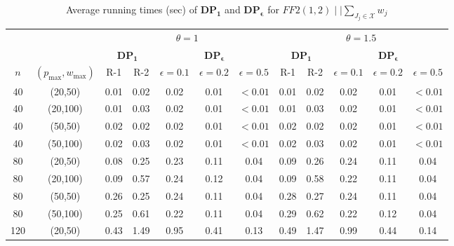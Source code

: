 \documentclass[12pt, eqno, limlimits]{article}
\begin{document}
\begin{sloppypar}
        \begin{table}[htpb]
            \footnotesize  
            \setlength{\tabcolsep}{2 pt} %
            \caption{Average running times (sec) of $\mathbf{DP_1}$ and $\mathbf{DP_{\epsilon}}$ for $FF2(1, 2)\mid  \mid \sum_{J_j \in \mathcal{X}} w_j$}  \label{TA-FF12}
            \vspace{-10pt} 
            \begin{center}
                \begin{tabular}{cccccccccccc}  \hline	
                    \multicolumn{2}{c}{} & \multicolumn{5}{c}{$\theta=1$} & \multicolumn{5}{c}{$\theta=1.5$}\\ 
                    \cmidrule(lr){3-7} \cmidrule(lr){8-12}
                    \multicolumn{2}{c}{} & \multicolumn{2}{c}{$\mathbf{DP_1}$} & \multicolumn{3}{c}{$\mathbf{DP_{\epsilon}}$} & \multicolumn{2}{c}{$\mathbf{DP_1}$} & \multicolumn{3}{c}{$\mathbf{DP_{\epsilon}}$} \\ 
                    \cmidrule(lr){3-4} \cmidrule(lr){5-7} \cmidrule(lr){8-9} \cmidrule(lr){10-12}
                    $n$ & $(p_{\max},w_{\max})$&  R-1 &   R-2 & $\epsilon=0.1$ &$\epsilon=0.2$ & $\epsilon=0.5$ & R-1 &   R-2 &$\epsilon=0.1$ &$\epsilon=0.2$ & $\epsilon=0.5$  \\ \hline
                    40 & (20,50)  & 0.01 & 0.02 & 0.02 & 0.01 & $<0.01$ & 0.01 & 0.02 & 0.02 & 0.01 & $<0.01$  \\ 
                    40 & (20,100) & 0.01 & 0.03 & 0.02 & 0.01 & $<0.01$ & 0.01 & 0.03 & 0.02 & 0.01 & $<0.01$   \\ 
                    40 & (50,50)  & 0.02 & 0.02 & 0.02 & 0.01 & $<0.01$ & 0.02 & 0.02 & 0.02 & 0.01 & $<0.01$  \\ 
                    40 & (50,100) & 0.02 & 0.03 & 0.02 & 0.01 & $<0.01$ & 0.02 & 0.03 & 0.02 & 0.01 & $<0.01$   \\ 
                    80 & (20,50)  & 0.08 & 0.25	& 0.23 & 0.11 &	0.04 & 0.09 & 0.26 & 0.24 & 0.11 & 0.04  \\ 
                    80 & (20,100) & 0.09 & 0.57 & 0.24 & 0.12 &	0.04 & 0.09	& 0.58 & 0.22 &	0.11 & 0.04	  \\ 
                    80 & (50,50)  & 0.26 & 0.25	& 0.24 & 0.11 & 0.04 & 0.28	& 0.27 & 0.24 &	0.11 & 0.04   \\ 
                    80 & (50,100) & 0.25 & 0.61	& 0.22 & 0.11 &	0.04 & 0.29	& 0.62 & 0.22 & 0.12 & 0.04   \\ 
                    120 & (20,50)  & 0.43 &	1.49 & 0.95 & 0.41 & 0.13 &	0.49 & 1.47	& 0.99 & 0.44 &	0.14  \\ 

\end{tabular}
\end{center}
\end{table}
\end{sloppypar}
\end{document}
